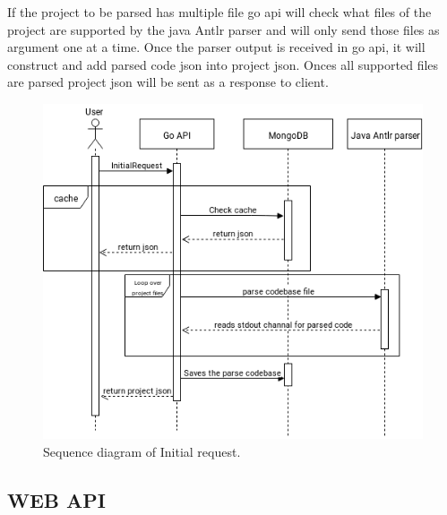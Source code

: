 If the project to be parsed has multiple file go \gls{api} will check what files of the project are supported by the java \gls{Antlr} parser and will only send those files as argument one at a time. Once the parser output is received in go \gls{api}, it will construct and add parsed code \gls{json} into project \gls{json}. Onces all supported files are parsed project \gls{json} will be sent as a response to \gls{client}.

\begin{figure}[H] 
    \includegraphics[width=\textwidth]{inc/images/InitialRequestSequenceDiagram.png}
    \caption{Sequence diagram of Initial request.}
    \label{fig:sequenceInitial}
\end{figure}

\subsection{WEB API}

